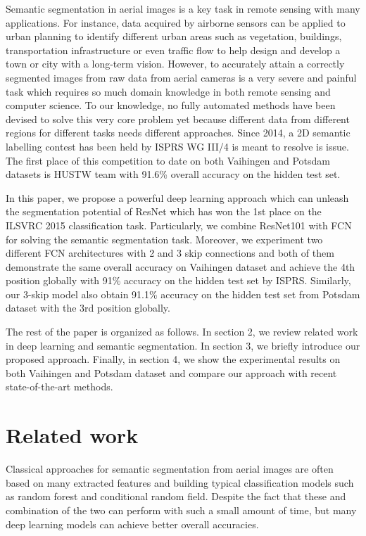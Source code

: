 \documentclass[conference]{IEEEtran}
\begin{document}
Semantic segmentation in aerial images is a key task in remote sensing with many
applications. For instance, data acquired by airborne sensors can be applied to
urban planning to identify different urban areas such as vegetation, buildings,
transportation infrastructure or even traffic flow to help design and develop
a town or city with a long-term vision. However, to accurately attain a
correctly segmented images from raw data from aerial cameras is a very severe
and painful task which requires so much domain knowledge in both remote sensing
and computer science. To our knowledge, no fully automated methods have been
devised to solve this very core problem yet because different data from
different regions for different tasks needs different approaches. Since 2014, a
2D semantic labelling contest has been held by ISPRS WG III/4 is meant to
resolve is issue. The first place of this competition
\cite{segmentationcompetition} to date on both Vaihingen and Potsdam datasets
is HUSTW team with 91.6\% overall accuracy on the hidden test set.

In this paper, we propose a powerful deep learning approach which can unleash
the segmentation potential of ResNet which has won the 1st place on the ILSVRC
2015 classification task. Particularly, we combine ResNet101 with FCN for
solving the semantic segmentation task. Moreover, we experiment two different
FCN architectures with 2 and 3 skip connections and both of them demonstrate
the same overall accuracy on Vaihingen dataset and achieve the 4th position
globally with 91\% accuracy on the hidden test set by ISPRS. Similarly, our
3-skip model also obtain 91.1\% accuracy on the hidden test set from Potsdam
dataset with the 3rd position globally.

The rest of the paper is organized as follows. In section 2, we review related
work in deep learning and semantic segmentation. In section 3, we briefly
introduce our proposed approach. Finally, in section 4, we show the experimental
results on both Vaihingen and Potsdam dataset and compare our approach with
recent state-of-the-art methods.

\section{Related work}
Classical approaches for semantic segmentation from aerial images are often
based on many extracted features and building typical classification models
such as random forest and conditional random field. Despite the fact that
these and combination of the two can perform with such a small amount of time,
but many deep learning models can achieve better overall accuracies.
\end{document}
